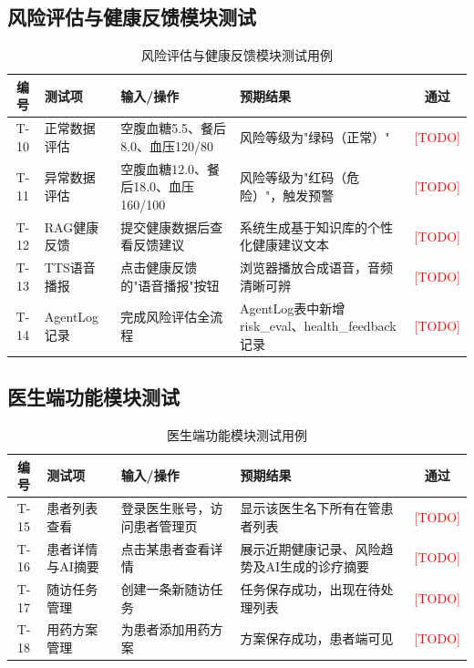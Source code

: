 \subsection{风险评估与健康反馈模块测试}

\begin{table}[H]
\centering
\caption{风险评估与健康反馈模块测试用例}
\label{tab:test-risk}
\begin{tabularx}{\textwidth}{|c|l|X|X|c|}
\hline
\textbf{编号} & \textbf{测试项} & \textbf{输入/操作} & \textbf{预期结果} & \textbf{通过} \\
\hline
T-10 & 正常数据评估 & 空腹血糖5.5、餐后8.0、血压120/80 & 风险等级为"绿码（正常）" & \textcolor{red}{[TODO]} \\
\hline
T-11 & 异常数据评估 & 空腹血糖12.0、餐后18.0、血压160/100 & 风险等级为"红码（危险）"，触发预警 & \textcolor{red}{[TODO]} \\
\hline
T-12 & RAG健康反馈 & 提交健康数据后查看反馈建议 & 系统生成基于知识库的个性化健康建议文本 & \textcolor{red}{[TODO]} \\
\hline
T-13 & TTS语音播报 & 点击健康反馈的"语音播报"按钮 & 浏览器播放合成语音，音频清晰可辨 & \textcolor{red}{[TODO]} \\
\hline
T-14 & AgentLog记录 & 完成风险评估全流程 & AgentLog表中新增risk\_eval、health\_feedback记录 & \textcolor{red}{[TODO]} \\
\hline
\end{tabularx}
\end{table}

\subsection{医生端功能模块测试}

\begin{table}[H]
\centering
\caption{医生端功能模块测试用例}
\label{tab:test-doctor}
\begin{tabularx}{\textwidth}{|c|l|X|X|c|}
\hline
\textbf{编号} & \textbf{测试项} & \textbf{输入/操作} & \textbf{预期结果} & \textbf{通过} \\
\hline
T-15 & 患者列表查看 & 登录医生账号，访问患者管理页 & 显示该医生名下所有在管患者列表 & \textcolor{red}{[TODO]} \\
\hline
T-16 & 患者详情与AI摘要 & 点击某患者查看详情 & 展示近期健康记录、风险趋势及AI生成的诊疗摘要 & \textcolor{red}{[TODO]} \\
\hline
T-17 & 随访任务管理 & 创建一条新随访任务 & 任务保存成功，出现在待处理列表 & \textcolor{red}{[TODO]} \\
\hline
T-18 & 用药方案管理 & 为患者添加用药方案 & 方案保存成功，患者端可见 & \textcolor{red}{[TODO]} \\
\hline
\end{tabularx}
\end{table}

